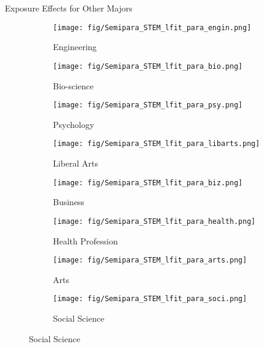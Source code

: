 \documentclass[aspectratio=169,xcolor=dvipsnames]{beamer}
\begin{document}
\begin{frame}{Exposure Effects for Other Majors}
\vspace{-0.8cm}
\begin{figure}[H]
    \centering
	\begin{subfigure}[t]{0.33\textwidth}
        \centering
    		\caption{Engineering}
    		\texttt{[image: fig/Semipara\_STEM\_lfit\_para\_engin.png]}
	\end{subfigure}%
	\begin{subfigure}[t]{0.33\textwidth}
	    \centering
    		\caption{Bio-science}
    		\texttt{[image: fig/Semipara\_STEM\_lfit\_para\_bio.png]}
	\end{subfigure}%
	\begin{subfigure}[t]{0.33\textwidth}
	    \centering
    		\caption{Psychology}
    		\texttt{[image: fig/Semipara\_STEM\_lfit\_para\_psy.png]}
	\end{subfigure}
	\par\smallskip
        \begin{subfigure}[t]{0.33\textwidth}
        \centering
    		\caption{Liberal Arts}
    		\texttt{[image: fig/Semipara\_STEM\_lfit\_para\_libarts.png]}
	\end{subfigure}%
	\begin{subfigure}[t]{0.33\textwidth}
	    \centering
    		\caption{Business}
    		\texttt{[image: fig/Semipara\_STEM\_lfit\_para\_biz.png]}
	\end{subfigure}%
	\begin{subfigure}[t]{0.33\textwidth}
	    \centering
    		\caption{Health Profession}
    		\texttt{[image: fig/Semipara\_STEM\_lfit\_para\_health.png]}
	\end{subfigure}
        \par\smallskip
        \begin{subfigure}[t]{0.33\textwidth}
        \centering
    		\caption{Arts}
    		\texttt{[image: fig/Semipara\_STEM\_lfit\_para\_arts.png]}
	\end{subfigure}%
	\begin{subfigure}[t]{0.33\textwidth}
	    \centering
    		\caption{Social Science}
    		\texttt{[image: fig/Semipara\_STEM\_lfit\_para\_soci.png]}
	\end{subfigure}%
    \end{figure}

\end{frame}
\end{document}
